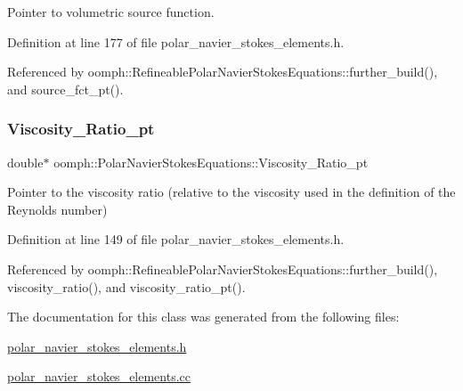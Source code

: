 Pointer to volumetric source function. 



Definition at line 177 of file polar\+\_\+navier\+\_\+stokes\+\_\+elements.\+h.



Referenced by oomph\+::\+Refineable\+Polar\+Navier\+Stokes\+Equations\+::further\+\_\+build(), and source\+\_\+fct\+\_\+pt().

\mbox{\label{classoomph_1_1PolarNavierStokesEquations_a24e640611fdce1c8edf25a20f2cf04be}} 
\subsubsection{\texorpdfstring{Viscosity\+\_\+\+Ratio\+\_\+pt}{Viscosity\_Ratio\_pt}}
{\footnotesize\ttfamily double$\ast$ oomph\+::\+Polar\+Navier\+Stokes\+Equations\+::\+Viscosity\+\_\+\+Ratio\+\_\+pt\hspace{0.3cm}{\ttfamily [protected]}}



Pointer to the viscosity ratio (relative to the viscosity used in the definition of the Reynolds number) 



Definition at line 149 of file polar\+\_\+navier\+\_\+stokes\+\_\+elements.\+h.



Referenced by oomph\+::\+Refineable\+Polar\+Navier\+Stokes\+Equations\+::further\+\_\+build(), viscosity\+\_\+ratio(), and viscosity\+\_\+ratio\+\_\+pt().



The documentation for this class was generated from the following files\+:\begin{DoxyCompactItemize}
\item 
\hyperlink{polar__navier__stokes__elements_8h}{polar\+\_\+navier\+\_\+stokes\+\_\+elements.\+h}\item 
\hyperlink{polar__navier__stokes__elements_8cc}{polar\+\_\+navier\+\_\+stokes\+\_\+elements.\+cc}\end{DoxyCompactItemize}
